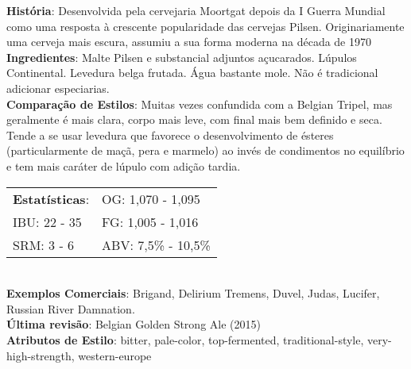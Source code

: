 \textbf{História}: Desenvolvida pela cervejaria Moortgat depois da I Guerra Mundial como uma resposta à crescente popularidade das cervejas Pilsen. Originariamente uma cerveja mais escura, assumiu a sua forma moderna na década de 1970 \\
\textbf{Ingredientes}: Malte Pilsen e substancial adjuntos açucarados. Lúpulos Continental. Levedura belga frutada. Água bastante mole. Não é tradicional adicionar especiarias. \\
\textbf{Comparação de Estilos}: Muitas vezes confundida com a Belgian Tripel, mas geralmente é mais clara, corpo mais leve, com final mais bem definido e seca. Tende a se usar levedura que favorece o desenvolvimento de ésteres (particularmente de maçã, pera e marmelo) ao invés de condimentos no equilíbrio e tem mais caráter de lúpulo com adição tardia. \\
\begin{tabular}{@{}p{35mm}p{35mm}@{}}
  \textbf{Estatísticas}: & OG: 1,070 - 1,095  \\
  IBU: 22 - 35  & FG: 1,005 - 1,016   \\
  SRM: 3 - 6 & ABV: 7,5\% - 10,5\%
\end{tabular}\\
\textbf{Exemplos Comerciais}: Brigand, Delirium Tremens, Duvel, Judas, Lucifer, Russian River Damnation. \\
\textbf{Última revisão}: Belgian Golden Strong Ale (2015) \\
\textbf{Atributos de Estilo}: bitter, pale-color, top-fermented, traditional-style, very-high-strength, western-europe
